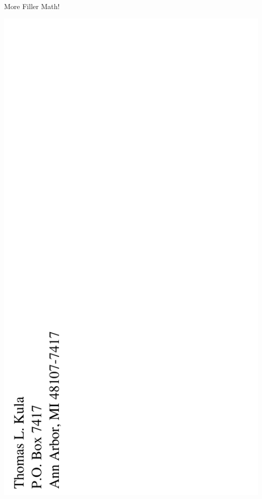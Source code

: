 \documentclass[12pt]{article}
\begin{document}
\begin{center}More Filler Math!\end{center}

\newpage

\includegraphics{backpage.png}
\end{document}
